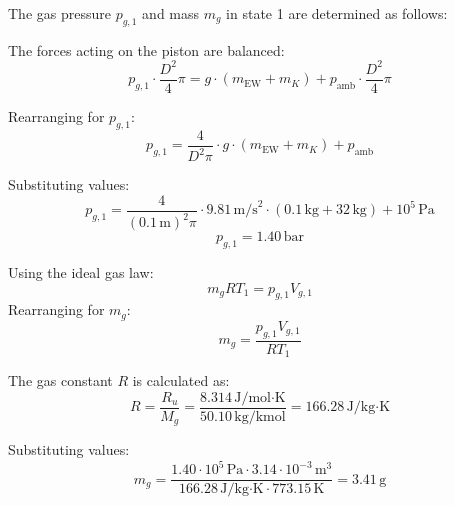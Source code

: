 The gas pressure \( p_{g,1} \) and mass \( m_g \) in state 1 are determined as follows:  

The forces acting on the piston are balanced:  
\[
p_{g,1} \cdot \frac{D^2}{4} \pi = g \cdot (m_{\text{EW}} + m_K) + p_{\text{amb}} \cdot \frac{D^2}{4} \pi
\]  

Rearranging for \( p_{g,1} \):  
\[
p_{g,1} = \frac{4}{D^2 \pi} \cdot g \cdot (m_{\text{EW}} + m_K) + p_{\text{amb}}
\]  

Substituting values:  
\[
p_{g,1} = \frac{4}{(0.1 \, \text{m})^2 \pi} \cdot 9.81 \, \text{m/s}^2 \cdot (0.1 \, \text{kg} + 32 \, \text{kg}) + 10^5 \, \text{Pa}
\]  
\[
p_{g,1} = 1.40 \, \text{bar}
\]  

Using the ideal gas law:  
\[
m_g R T_1 = p_{g,1} V_{g,1}
\]  
Rearranging for \( m_g \):  
\[
m_g = \frac{p_{g,1} V_{g,1}}{R T_1}
\]  

The gas constant \( R \) is calculated as:  
\[
R = \frac{R_u}{M_g} = \frac{8.314 \, \text{J/mol·K}}{50.10 \, \text{kg/kmol}} = 166.28 \, \text{J/kg·K}
\]  

Substituting values:  
\[
m_g = \frac{1.40 \cdot 10^5 \, \text{Pa} \cdot 3.14 \cdot 10^{-3} \, \text{m}^3}{166.28 \, \text{J/kg·K} \cdot 773.15 \, \text{K}} = 3.41 \, \text{g}
\]